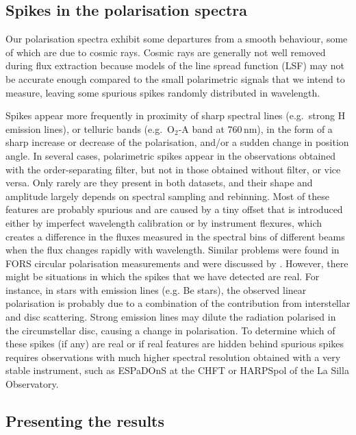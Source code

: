 \documentclass[a4paper]{aa}
\begin{document}
\subsection{Spikes in the polarisation spectra}\label{Sect_Spikes}
Our polarisation spectra exhibit some departures from a smooth
behaviour, some of which are due to cosmic rays. Cosmic rays are generally
not well removed during flux extraction because models of the line
spread function (LSF) may not be accurate enough compared to the small
polarimetric signals that we intend to measure, leaving some spurious
spikes randomly distributed in wavelength.

Spikes appear more frequently in proximity of sharp spectral lines
(e.g.\ strong H emission lines), or telluric bands (e.g.\ O$_2$-A band
at 760\,nm), in the form of a sharp increase or decrease of the
polarisation, and/or a sudden change in position angle. In several
cases, polarimetric spikes appear in the observations obtained with
the order-separating filter, but not in those obtained without filter,
or vice versa. Only rarely are they present in both datasets, and their
shape and amplitude largely depends on spectral sampling and
rebinning. Most of these features are probably spurious and are caused by a tiny
offset that is introduced either by imperfect wavelength calibration or by
instrument flexures, which creates a difference in the fluxes measured in
the spectral bins of different beams when the flux changes rapidly with wavelength. Similar problems were found in
FORS circular polarisation measurements and were discussed by
\citet{Bagetal13}. However, there might be situations in which the spikes
that we have detected are real. For instance, in stars with emission lines (e.g. Be
stars), the observed linear polarisation is probably due to a combination
of the contribution from interstellar and disc scattering. Strong
emission lines may dilute the radiation polarised in the circumstellar
disc, causing a change in polarisation.  To determine which of these spikes
(if any) are real or if real features are hidden behind
spurious spikes requires observations with much higher spectral
resolution obtained with a very stable instrument, such as ESPaDOnS
at the CHFT or HARPSpol of the La Silla Observatory.


\subsection{Presenting the results}
\end{document}
